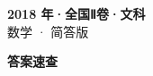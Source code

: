 \documentclass[zihao=-4, a4paper]{ctexart}
\begin{document}
\begin{center}
  {\Large\bfseries 2018 年·全国Ⅱ卷·文科}\\[4pt]
  {\large 数学 · 简答版}
\end{center}
\medskip
{}

\clearpage
{}
\begin{center}{\Large\bfseries 答案速查}\end{center}
\medskip

\end{document}
